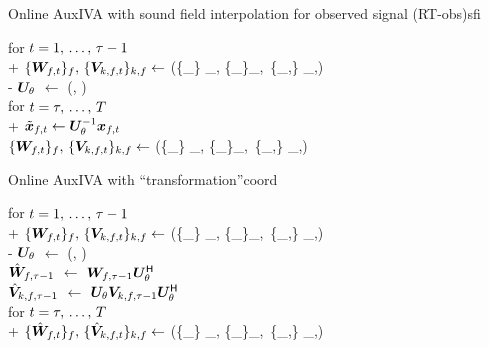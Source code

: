 \documentclass[sip,biber]{now-journal}
\begin{document}
\begin{algorithm}{Online AuxIVA with sound field interpolation for observed signal (RT-obs)}{sfi}
  \begin{pseudo}
    for $t = 1,\, \dots,\, \tau - 1$ \\+
      $\{\Demix _{\ft}\}_{\freq},\, \{\cov _{\src,\ft}\} _{\src,\freq} \gets$ (\{\Obs _{\ft}\} _{\freq}, \{\Demix _{\ft[-1]}\}_{\freq},\, \{\cov _{\src,\ft[-1]}\} _{\src,\freq}) \\-
    $\bm{U} _{\theta}$ $\gets$ (\Mic, \rotDeg) \\
    for $t = \tau,\, \dots,\, T$ \\+
      $\refObs _{\ft} \gets \rotMat _{\rotDeg} ^{-1} \Obs _{\ft}$ \ct{$(\forall \freq)$} \\
      $\{\Demix _{\ft}\}_{\freq},\, \{\cov _{\src,\ft}\} _{\src,\freq} \gets$ (\{ _{\ft}\} _{\freq}, \{\Demix _{\ft[-1]}\}_{\freq},\, \{\cov _{\src,\ft[-1]}\} _{\src,\freq})
  \end{pseudo}
\end{algorithm}
\begin{algorithm}{Online AuxIVA with ``transformation''}{coord}
  \begin{pseudo}
    for $t = 1,\, \dots,\, \tau - 1$ \\+
      $\{\Demix _{\ft}\}_{\freq},\, \{\cov _{\src,\ft}\} _{\src,\freq} \gets$ (\{\Obs _{\ft}\} _{\freq}, \{\Demix _{\ft[-1]}\}_{\freq},\, \{\cov _{\src,\ft[-1]}\} _{\src,\freq}) \\-
    $\bm{U} _{\theta}$ $\gets$ (\Mic, \rotDeg) \\
    {$\hat{\bm{W}} _{f,\tau - 1}$} $\gets$ $\bm{W} _{f,\tau - 1} \bm{U} _{\theta} ^{\mathsf{H}}$ \ct{$(\forall \freq)$} \\
    {$\hat{\bm{V}} _{k,f,\tau - 1}$} $\gets$ $\bm{U} _{\theta} \bm{V} _{k,f,\tau - 1} \bm{U} _{\theta} ^{\mathsf{H}}$ \ct{$(\forall \src,\freq)$} \\
    for $t = \tau,\, \dots,\, T$ \\+
      $\{\rotDemix _{\ft}\}_{\freq},\, \{\rotCov _{\src,\ft}\} _{\src,\freq} \gets$ (\{\Obs _{\ft}\} _{\freq}, \{\rotDemix _{\ft[-1]}\}_{\freq},\, \{\rotCov _{\src,\ft[-1]}\} _{\src,\freq})
  \end{pseudo}
\end{algorithm}
\end{document}
